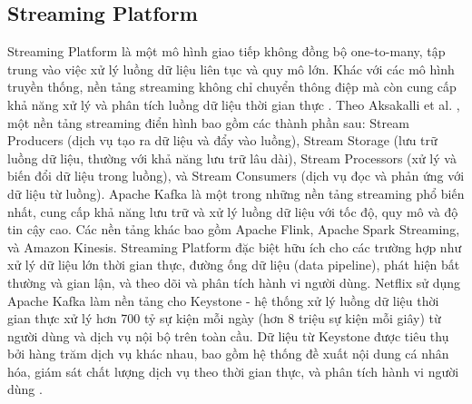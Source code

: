 \subsection{Streaming Platform}
Streaming Platform là một mô hình giao tiếp không đồng bộ one-to-many, tập trung vào việc xử lý luồng dữ liệu liên tục và quy mô lớn. Khác với các mô hình truyền thống, nền tảng streaming không chỉ chuyển thông điệp mà còn cung cấp khả năng xử lý và phân tích luồng dữ liệu thời gian thực \cite{richardson2019}.
Theo Aksakalli et al. \cite{aksakalli2021}, một nền tảng streaming điển hình bao gồm các thành phần sau: Stream Producers (dịch vụ tạo ra dữ liệu và đẩy vào luồng), Stream Storage (lưu trữ luồng dữ liệu, thường với khả năng lưu trữ lâu dài), Stream Processors (xử lý và biến đổi dữ liệu trong luồng), và Stream Consumers (dịch vụ đọc và phản ứng với dữ liệu từ luồng).
Apache Kafka là một trong những nền tảng streaming phổ biến nhất, cung cấp khả năng lưu trữ và xử lý luồng dữ liệu với tốc độ, quy mô và độ tin cậy cao. Các nền tảng khác bao gồm Apache Flink, Apache Spark Streaming, và Amazon Kinesis.
Streaming Platform đặc biệt hữu ích cho các trường hợp như xử lý dữ liệu lớn thời gian thực, đường ống dữ liệu (data pipeline), phát hiện bất thường và gian lận, và theo dõi và phân tích hành vi người dùng.
Netflix sử dụng Apache Kafka làm nền tảng cho Keystone - hệ thống xử lý luồng dữ liệu thời gian thực xử lý hơn 700 tỷ sự kiện mỗi ngày (hơn 8 triệu sự kiện mỗi giây) từ người dùng và dịch vụ nội bộ trên toàn cầu. Dữ liệu từ Keystone được tiêu thụ bởi hàng trăm dịch vụ khác nhau, bao gồm hệ thống đề xuất nội dung cá nhân hóa, giám sát chất lượng dịch vụ theo thời gian thực, và phân tích hành vi người dùng \cite{idc2021}.
